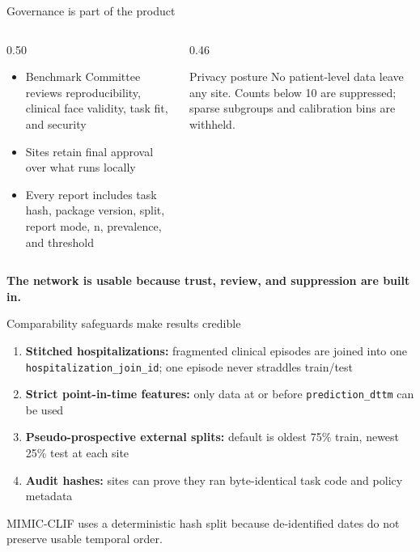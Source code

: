 \documentclass[aspectratio=169,11pt,xcolor={table}]{beamer}
\newcommand{\emphc}[1]{{\color{flairblue}\textbf{#1}}}
\newcommand{\bigclaim}[1]{\begin{center}{\Large\color{flairink}\textbf{#1}}\end{center}}
\begin{document}
\begin{frame}{Governance is part of the product}
  \begin{columns}[T]
  \begin{column}{0.50\textwidth}
    \begin{itemize}
      \item Benchmark Committee reviews reproducibility, clinical face validity, task fit, and security
      \item Sites retain final approval over what runs locally
      \item Every report includes task hash, package version, split, report mode, n, prevalence, and threshold
    \end{itemize}
  \end{column}
  \begin{column}{0.46\textwidth}
    \begin{block}{Privacy posture}
      No patient-level data leave any site. Counts below 10 are suppressed; sparse subgroups and calibration bins are withheld.
    \end{block}
  \end{column}
  \end{columns}
  \vfill
  \bigclaim{The network is usable because trust, review, and suppression are built in.}
\end{frame}

\begin{frame}{Comparability safeguards make results credible}
  \begin{enumerate}
    \item \emphc{Stitched hospitalizations:} fragmented clinical episodes are joined into one \texttt{hospitalization\_join\_id}; one episode never straddles train/test
    \item \emphc{Strict point-in-time features:} only data at or before \texttt{prediction\_dttm} can be used
    \item \emphc{Pseudo-prospective external splits:} default is oldest 75\% train, newest 25\% test at each site
    \item \emphc{Audit hashes:} sites can prove they ran byte-identical task code and policy metadata
  \end{enumerate}
  \vfill
  {\color{flairmuted}\small MIMIC-CLIF uses a deterministic hash split because de-identified dates do not preserve usable temporal order.}
\end{frame}
\end{document}

